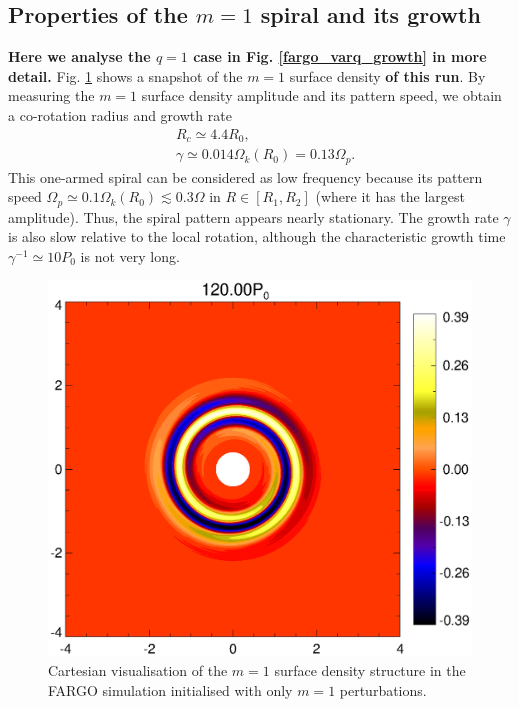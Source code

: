 \subsection{Properties of the $m=1$ spiral and its growth}\label{fargo_m1}
{\bf Here we analyse the $q=1$ case in Fig. \ref{fargo_varq_growth} in
  more detail.  
} 
Fig. \ref{2d_fargo_viz} shows a snapshot of the $m=1$ surface
density {\bf of this run}. 
By measuring the $m=1$ surface density amplitude and its
pattern speed, we obtain a co-rotation radius and growth rate 
\begin{align*}
  &R_c \simeq 4.4R_0,\\
  &\gamma\simeq 0.014\Omega_k(R_0) = 0.13\Omega_p. 
\end{align*}
This one-armed spiral can be considered as low frequency because its 
pattern speed $\Omega_p \simeq 0.1\Omega_k(R_0)\lesssim 0.3\Omega$ in
$R\in[R_{1},R_{2}]$ (where it has the largest amplitude). Thus, the spiral 
pattern appears nearly stationary. The growth rate $\gamma$ is also slow
relative to the local rotation, although the characteristic growth
time $\gamma^{-1} \simeq 10P_0$ is not very long.  
\begin{figure}
  \includegraphics[width=\linewidth]{figures/polarxy2_dens120_fargo}
  \caption{Cartesian visualisation of the $m=1$ surface density
    structure in the FARGO simulation initialised with only $m=1$
    perturbations. 
    \label{2d_fargo_viz}} 
\end{figure}   

